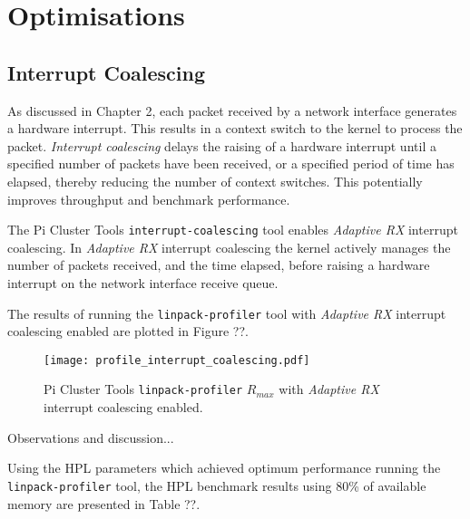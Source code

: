 %
%
\section{Optimisations}


%
%
\subsection{Interrupt Coalescing}

As discussed in Chapter 2, each packet received by a network interface generates a hardware interrupt. This results in a context switch to the kernel to process the packet. \emph{Interrupt coalescing} delays the raising of a hardware interrupt until a specified number of packets have been received, or a specified period of time has elapsed, thereby reducing the number of context switches. This potentially improves throughput and benchmark performance.

The Pi Cluster Tools \verb|interrupt-coalescing| tool enables \emph{Adaptive RX} interrupt coalescing. In \emph{Adaptive RX} interrupt coalescing the kernel actively manages the number of packets received, and the time elapsed, before raising a hardware interrupt on the network interface receive queue.

The results of running the \verb|linpack-profiler| tool with \emph{Adaptive RX} interrupt coalescing enabled are plotted in Figure ??.

\begin{figure}[h]
	\centering
	\texttt{[image: profile\_interrupt\_coalescing.pdf]}
	\caption{Pi Cluster Tools \texttt{linpack-profiler} $R_{max}$ with \emph{Adaptive RX} interrupt coalescing enabled.}
	\label{fig:subim1}
\end{figure}

Observations and discussion...

Using the HPL parameters which achieved optimum performance running the \texttt{linpack-profiler} tool, the HPL benchmark results using 80\% of available memory are presented in Table ??. 

